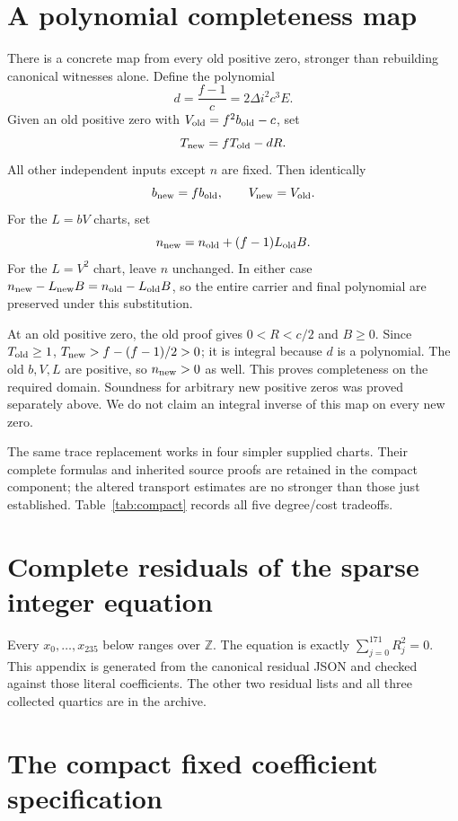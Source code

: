 \documentclass[11pt]{article}
\theoremstyle{definition}
\newcommand{\Z}{\mathbb Z}\newcommand{\N}{\mathbb N}\newcommand{\Q}{\mathbb Q}
\begin{document}
\section{A polynomial completeness map}

There is a concrete map from every old positive zero, stronger than
rebuilding canonical witnesses alone. Define the polynomial
\[
 d=\frac{f-1}{c}=2\Delta i^2c^3E.
\]
Given an old positive zero with $V_{\rm old}=f^2b_{\rm old}-c$, set
\begin{equation}\label{eq:Tnew}
 T_{\rm new}=fT_{\rm old}-dR.
\end{equation}
All other independent inputs except $n$ are fixed. Then identically
\[
 b_{\rm new}=f b_{\rm old},\qquad V_{\rm new}=V_{\rm old}.
\]
For the $L=bV$ charts, set
\[
 n_{\rm new}=n_{\rm old}+(f-1)L_{\rm old}B.
\]
For the $L=V^2$ chart, leave $n$ unchanged. In either case
$n_{\rm new}-L_{\rm new}B=n_{\rm old}-L_{\rm old}B$, so the entire
carrier and final polynomial are preserved under this substitution.

At an old positive zero, the old proof gives $0<R<c/2$ and $B\ge0$.
Since $T_{\rm old}\ge1$,
$T_{\rm new}>f-(f-1)/2>0$; it is integral because $d$ is a polynomial.
The old $b,V,L$ are positive, so $n_{\rm new}>0$ as well.
This proves completeness on the required domain. Soundness for arbitrary
new positive zeros was proved separately above. We do not claim an
integral inverse of this map on every new zero.

The same trace replacement works in four simpler supplied charts.
Their complete formulas and inherited source proofs are retained in
the compact component; the altered transport estimates are no stronger
than those just established. Table~\ref{tab:compact} records all five
degree/cost tradeoffs.




\appendix
\section{Complete residuals of the sparse integer equation}\label{app:direct}
Every $x_0,\ldots,x_{235}$ below ranges over $\Z$. The equation is exactly
$\sum_{j=0}^{171}R_j^2=0$. This appendix is generated from the canonical
residual JSON and checked against those literal coefficients. The other
two residual lists and all three collected quartics are in the archive.


\section{The compact fixed coefficient specification}\label{app:coefficients}

\end{document}
